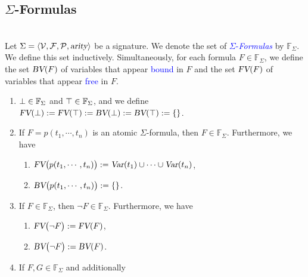 \subsection{$\Sigma$-Formulas}
\begin{Definition}
\label{predicate-formula} \hspace*{\fill}
  \\
Let $\Sigma = \langle \mathcal{V}, \mathcal{F}, \mathcal{P}, \textsl{arity} \rangle$ be a signature.
    We denote the set of \textcolor{blue}{$\Sigma$-\emph{Formulas}} by $\mathbb{F}_\Sigma$.
    We define this set inductively.
    Simultaneously, for each formula $F \in \mathbb{F}_\Sigma$, we define the set $\textsl{BV}(F)$ of variables that appear \textcolor{blue}{bound} in $F$ and the set $\textsl{FV}(F)$ of variables that appear \textcolor{blue}{free} in $F$.
    \begin{enumerate}
    \item $\bot \in \mathbb{F}_\Sigma$ and $\top \in \mathbb{F}_\Sigma$, and we define \\[0.2cm]
          \hspace*{1.3cm} $\textsl{FV}(\bot) := \textsl{FV}(\top) := \textsl{BV}(\bot) := \textsl{BV}(\top) := \{\}$.
    \item If $F = p(t_1,\cdots,t_n)$ is an atomic $\Sigma$-formula, then $F \in \mathbb{F}_\Sigma$.
          Furthermore, we have
          \begin{enumerate}
          \item $\textsl{FV}\bigl(p(t_1,\cdots,t_n) \bigr) := \textsl{Var}(t_1) \cup \cdots \cup \textsl{Var}(t_n)$,
          \item $\textsl{BV}\bigl(p(t_1,\cdots,t_n) \bigr) := \{\}$.
          \end{enumerate}
    \item If $F \in \mathbb{F}_\Sigma$, then $\neg F \in \mathbb{F}_\Sigma$.  Furthermore, we have
          \begin{enumerate}
          \item $\textsl{FV}\bigl( \neg F \bigr) := \textsl{FV}(F)$,
          \item $\textsl{BV}\bigl( \neg F \bigr) := \textsl{BV}(F)$.
          \end{enumerate}
    \item If $F, G \in \mathbb{F}_\Sigma$ and additionally \\[0.2cm]

\end{enumerate}
\end{Definition}
